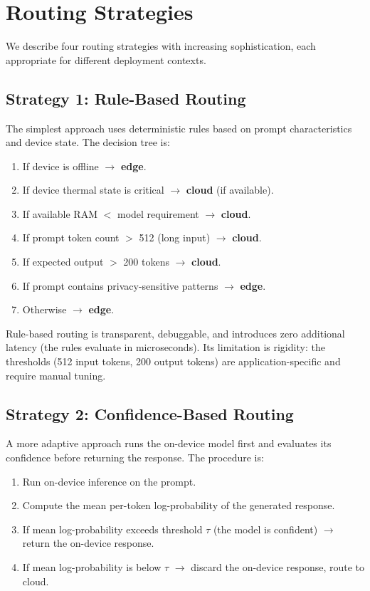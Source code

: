 \documentclass[12pt, letterpaper, twoside]{report}
\begin{document}
\section{Routing Strategies}
\label{sec:routing_strategies}

We describe four routing strategies with increasing sophistication, each appropriate for different deployment contexts.

\subsection{Strategy 1: Rule-Based Routing}
\label{subsec:rule_routing}

The simplest approach uses deterministic rules based on prompt characteristics and device state. The decision tree is:

\begin{enumerate}[itemsep=3pt]
\item If device is offline $\to$ \textbf{edge}.
\item If device thermal state is critical $\to$ \textbf{cloud} (if available).
\item If available RAM $<$ model requirement $\to$ \textbf{cloud}.
\item If prompt token count $>$ 512 (long input) $\to$ \textbf{cloud}.
\item If expected output $>$ 200 tokens $\to$ \textbf{cloud}.
\item If prompt contains privacy-sensitive patterns $\to$ \textbf{edge}.
\item Otherwise $\to$ \textbf{edge}.
\end{enumerate}

Rule-based routing is transparent, debuggable, and introduces zero additional latency (the rules evaluate in microseconds). Its limitation is rigidity: the thresholds (512 input tokens, 200 output tokens) are application-specific and require manual tuning.

\subsection{Strategy 2: Confidence-Based Routing}
\label{subsec:confidence_routing}

A more adaptive approach runs the on-device model first and evaluates its confidence before returning the response. The procedure is:

\begin{enumerate}[itemsep=3pt]
\item Run on-device inference on the prompt.
\item Compute the mean per-token log-probability of the generated response.
\item If mean log-probability exceeds threshold $\tau$ (the model is confident) $\to$ return the on-device response.
\item If mean log-probability is below $\tau$ $\to$ discard the on-device response, route to cloud.
\end{enumerate}
\end{document}
